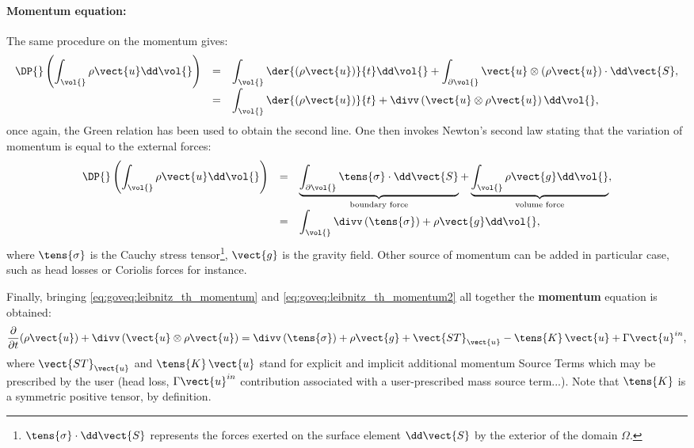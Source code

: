 \paragraph{Momentum equation:}
The same procedure on the momentum gives:
\begin{equation}\label{eq:goveq:leibnitz_th_momentum}
\begin{array}{r c l}
\displaystyle \DP{} \left( \int_{\vol{} }\rho \vect{u} \dd \vol{}\right) &=& 
\displaystyle \int_{\vol{} }\der{\left( \rho \vect{u} \right) }{t} \dd \vol{} + \int_{\partial \vol{}}  \vect{u}\otimes \left( \rho \vect{u} \right) \cdot  \dd \vect{S}, \\
\displaystyle &=&
\displaystyle \int_{\vol{ }} \der{\left( \rho \vect{u} \right) }{t} + \divv \left( \vect{u} \otimes \rho \vect{u} \right)  \dd \vol{},
\end{array}
 \end{equation} 
once again, the Green relation has been used to obtain the second line. One then invokes Newton's second law
stating that the variation of momentum is equal to the external forces:
\begin{equation}\label{eq:goveq:leibnitz_th_momentum2}
\begin{array}{r c l}
\displaystyle \DP{} \left( \int_{\vol{}} \rho \vect{u} \dd \vol{}\right) &=& 
\displaystyle 
\underbrace{
\int_{\partial \vol{}}  \tens{\sigma} \cdot  \dd \vect{S}
}_{
\text{ boundary force }
}
+
\underbrace{
\int_{\vol{} }\rho \vect{g} \dd \vol{}
}_{
\text{ volume force }
}
, \\
\displaystyle &=&
\displaystyle \int_{\vol{ }} \divv \left( \tens{\sigma} \right) + \rho \vect{g}  \dd \vol{},
\end{array}
 \end{equation} 
where $\tens{\sigma}$ is the Cauchy stress tensor\footnote{
$\tens{\sigma} \cdot \dd \vect{S}$ represents the forces exerted on the surface element
$ \dd \vect{S} $ by the exterior of the domain $\Omega$.
}, $\vect{g}$ is the gravity field. Other source of momentum can be added in particular case, such 
as head losses or Coriolis forces for instance.

Finally, bringing \eqref{eq:goveq:leibnitz_th_momentum} and \eqref{eq:goveq:leibnitz_th_momentum2} all together 
the \textbf{momentum} equation is obtained:
\begin{equation}\label{eq:momentum}
\dfrac{\partial }{\partial t}(\rho \vect{u})
+\divv \left( \vect{u}\otimes \rho \vect{u} \right)
=\divv \left( \tens{\sigma} \right) +\rho \vect{g} +\vect{ST}_{\vect{u}}-\tens{K}\,\vect{u} + \Gamma \vect{u}^{in},
\end{equation}
%
where $\vect{ST}_{\vect{u}}$ and $\tens{K}\,\vect{u}$ stand for explicit and implicit additional 
momentum Source Terms
 which may be prescribed by the user (head loss, $\Gamma \vect{u}^{in}$ 
contribution associated with a user-prescribed mass source term...).
Note that $\tens{K}$ is a symmetric positive tensor, by definition. 

